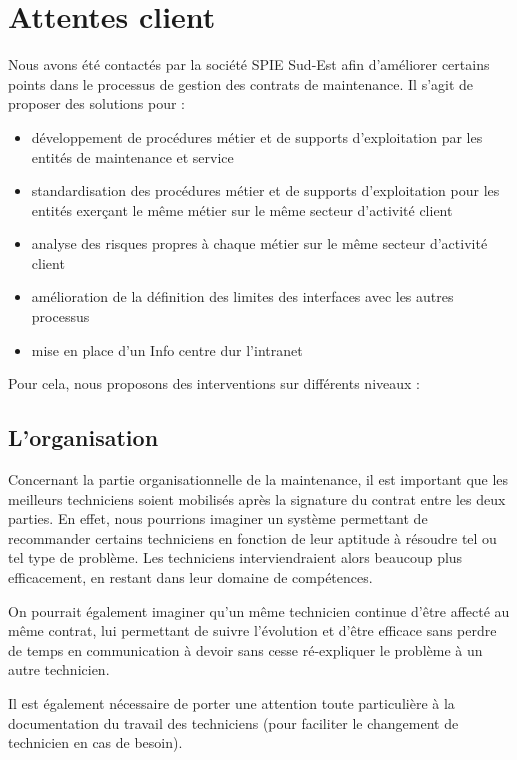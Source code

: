 \chapter{Attentes client}

	Nous avons été contactés par la société SPIE Sud-Est afin d'améliorer certains points dans le processus de gestion des contrats de maintenance. Il s'agit de proposer des solutions pour :

    \begin{itemize}
        \item développement de procédures métier et de supports d'exploitation par les entités de maintenance et service
        \item standardisation des procédures métier et de supports d'exploitation pour les entités exerçant le même métier sur le même secteur d'activité client
        \item analyse des risques propres à chaque métier sur le même secteur d'activité client
        \item amélioration de la définition des limites des interfaces avec les autres processus
        \item mise en place d'un Info centre dur l'intranet
    \end{itemize}

    Pour cela, nous proposons des interventions sur différents niveaux :

\section{L'organisation}
    Concernant la partie organisationnelle de la maintenance, il est important que les meilleurs techniciens soient mobilisés après la signature du contrat entre les deux parties. En effet, nous pourrions imaginer un système permettant de recommander certains techniciens en fonction de leur aptitude à résoudre tel ou tel type de problème. Les techniciens interviendraient alors beaucoup plus efficacement, en restant dans leur domaine de compétences.

    On pourrait également imaginer qu'un même technicien continue d'être affecté au même contrat, lui permettant de suivre l'évolution et d'être efficace sans perdre de temps en communication à devoir sans cesse ré-expliquer le problème à un autre technicien.

    Il est également nécessaire de porter une attention toute particulière à la documentation du travail des techniciens (pour faciliter le changement de technicien en cas de besoin).

